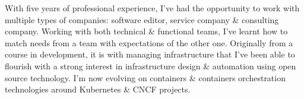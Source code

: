 

\begin{cvparagraph}

With five years of professional experience, I've had the opportunity to work with multiple types of companies: software editor, service company \& consulting company. Working with both technical \& functional teams, I've learnt how to match needs from a team with expectations of the other one. Originally from a course in development, it is with managing infrastructure that I've been able to flourish with a strong interest in infrastructure design \& automation using open source technology. I'm now evolving on containers \& containers orchestration technologies around Kubernetes \& CNCF projects.
\end{cvparagraph}
